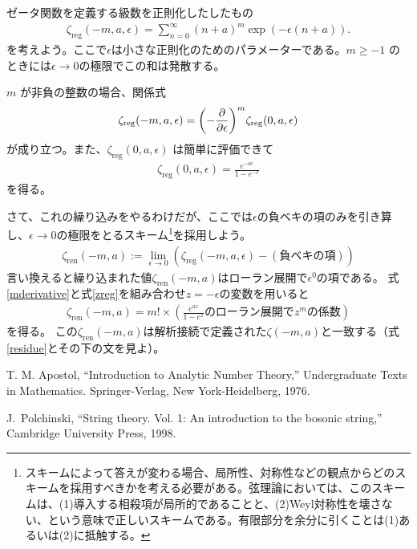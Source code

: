 \documentclass[pandoc,nomag,12pt,a4paper]{bxjsarticle}
\newcommand{\zreg}{\zeta_{\mathrm{reg}}}
\newcommand{\zren}{\zeta_{\mathrm{ren}}}
\begin{document}
ゼータ関数を定義する級数を正則化したしたもの
\begin{align}
  \zreg(-m,a,\epsilon)=\sum_{n=0}^{\infty}(n+a)^m\exp(-\epsilon(n+a)).
\end{align}
を考えよう。ここで$\epsilon$は小さな正則化のためのパラメーターである。$m \ge -1$ のときには$\epsilon\to 0$の極限でこの和は発散する。

$m$ が非負の整数の場合、関係式
\begin{align}
  \zreg(-m,a,\epsilon)=\qty(-\pdv{\epsilon})^{m}\zreg(0,a,\epsilon)\label{mderivative}
\end{align}
が成り立つ。また、$\zreg(0,a,\epsilon)$ は簡単に評価できて
\begin{align}
  \zreg(0,a,\epsilon)=\frac{e^{-a\epsilon}}{1-e^{-\epsilon}}\label{zreg}
\end{align}
を得る。

さて、これの繰り込みをやるわけだが、ここでは$\epsilon$の負ベキの項のみを引き算し、$\epsilon\to0$の極限をとるスキーム\footnote{スキームによって答えが変わる場合、局所性、対称性などの観点からどのスキームを採用すべきかを考える必要がある。弦理論においては、このスキームは、(1)導入する相殺項が局所的であることと、(2)Weyl対称性を壊さない、という意味で正しいスキームである。有限部分を余分に引くことは(1)あるいは(2)に抵触する。}を採用しよう。
\begin{align}
  \zren(-m,a):=\lim_{\epsilon\to 0} (\zreg(-m,a,\epsilon)-(\text{負ベキの項}))
\end{align}
言い換えると繰り込まれた値$\zren(-m,a)$はローラン展開で$\epsilon^0$の項である。
式\eqref{mderivative}と式\eqref{zreg}を組み合わせ$z=-\epsilon$の変数を用いると
\begin{align}
  \zren(-m,a)=m!\times (\frac{e^{az}}{1-e^{z}}\text{のローラン展開で} z^m \text{の係数} )
\end{align}
を得る。
この$\zren(-m,a)$は解析接続で定義された$\zeta(-m,a)$と一致する（式\eqref{residue}とその下の文を見よ）。
\begin{thebibliography}{9}
  T. M. Apostol, ``Introduction to Analytic Number Theory,''
  Undergraduate Texts in Mathematics. Springer-Verlag, New York-Heidelberg, 1976.

J.~Polchinski,
``String theory. Vol. 1: An introduction to the bosonic string,'' Cambridge University Press, 1998.

\end{thebibliography}
\end{document}
